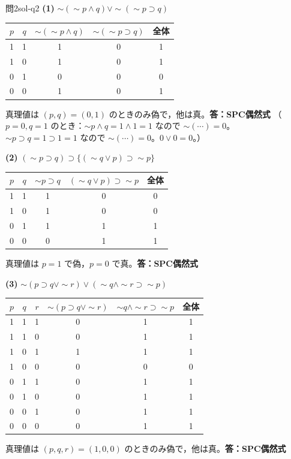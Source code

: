 \documentclass[autodetect-engine,dvi=dvipdfmx,ja=standard]{bxjsarticle}
\begin{document}
\begin{solution}{問2}{sol-q2}
\textbf{(1)} \(\sim(\sim p\land q)\lor\sim(\sim p\supset q)\)

\begin{center}
\begin{tabular}{cc|cc|c}
\toprule
\(p\) & \(q\) & \(\sim(\sim p\land q)\) & \(\sim(\sim p\supset q)\) & 全体 \\
\midrule
1 & 1 & 1 & 0 & 1 \\
1 & 0 & 1 & 0 & 1 \\
0 & 1 & 0 & 0 & 0 \\
0 & 0 & 1 & 0 & 1 \\
\bottomrule
\end{tabular}
\end{center}
真理値は \((p,q)=(0,1)\) のときのみ偽で，他は真。\textbf{答：SPC偶然式}
（\(p=0,q=1\) のとき：\(\sim p\land q=1\land1=1\) なので \(\sim(\cdots)=0\)。
\(\sim p\supset q=1\supset1=1\) なので \(\sim(\cdots)=0\)。\(0\lor0=0\)。）

\textbf{(2)} \((\sim p\supset q)\supset\bigl\{(\sim q\lor p)\supset\sim p\bigr\}\)

\begin{center}
\begin{tabular}{cc|c|c|c}
\toprule
\(p\) & \(q\) & \(\sim p\supset q\) & \((\sim q\lor p)\supset\sim p\) & 全体 \\
\midrule
1 & 1 & 1 & 0 & 0 \\
1 & 0 & 1 & 0 & 0 \\
0 & 1 & 1 & 1 & 1 \\
0 & 0 & 0 & 1 & 1 \\
\bottomrule
\end{tabular}
\end{center}
真理値は \(p=1\) で偽，\(p=0\) で真。\textbf{答：SPC偶然式}

\textbf{(3)} \(\sim(p\supset q\lor\sim r)\lor(\sim q\land\sim r\supset\sim p)\)

\begin{center}
\begin{tabular}{ccc|c|c|c}
\toprule
\(p\) & \(q\) & \(r\) & \(\sim(p\supset q\lor\sim r)\) & \(\sim q\land\sim r\supset\sim p\) & 全体 \\
\midrule
1&1&1&0&1&1\\
1&1&0&0&1&1\\
1&0&1&1&1&1\\
1&0&0&0&0&0\\
0&1&1&0&1&1\\
0&1&0&0&1&1\\
0&0&1&0&1&1\\
0&0&0&0&1&1\\
\bottomrule
\end{tabular}
\end{center}
真理値は \((p,q,r)=(1,0,0)\) のときのみ偽で，他は真。\textbf{答：SPC偶然式}
\end{solution}
\end{document}
